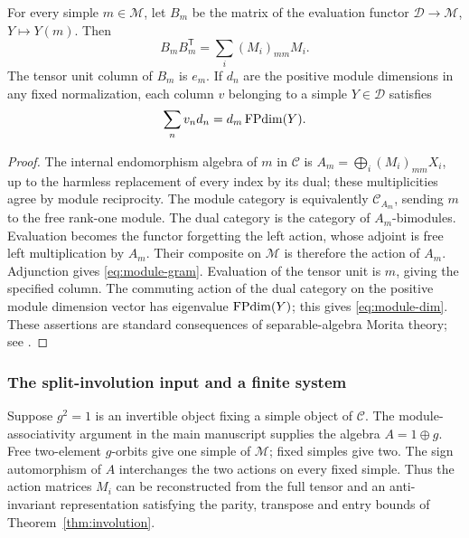\begin{proposition}\label{prop:dual-module-gram}
For every simple $m\in\mathcal M$, let $B_m$ be the matrix of the evaluation
functor $\mathcal D\to\mathcal M$, $Y\mapsto Y(m)$. Then
\begin{equation}\label{eq:module-gram}
 B_mB_m^{\mathsf T}=\sum_i(M_i)_{mm}M_i.
\end{equation}
The tensor unit column of $B_m$ is $e_m$. If $d_n$ are the positive module
dimensions in any fixed normalization, each column $v$ belonging to a
simple $Y\in\mathcal D$ satisfies
\begin{equation}\label{eq:module-dim}
 \sum_n v_nd_n=d_m\operatorname{FPdim}(Y).
\end{equation}
\end{proposition}
\begin{proof}
The internal endomorphism algebra of $m$ in $\mathcal C$ is
$A_m=\bigoplus_i(M_i)_{mm}X_i$, up to the harmless replacement of every
index by its dual; these multiplicities agree by module reciprocity.
The module category is equivalently $\mathcal C_{A_m}$, sending $m$ to
the free rank-one module. The dual category is the category of
$A_m$-bimodules. Evaluation becomes the functor forgetting the left action,
whose adjoint is free left multiplication by $A_m$. Their composite on
$\mathcal M$ is therefore the action of $A_m$. Adjunction gives
\eqref{eq:module-gram}. Evaluation of the tensor unit is $m$, giving the
specified column. The commuting action of the dual category on the
positive module dimension vector has eigenvalue $\operatorname{FPdim}(Y)$; this gives
\eqref{eq:module-dim}. These assertions are standard consequences of
separable-algebra Morita theory; see \cite[Chapter~7]{EGNO}.
\end{proof}

\subsubsection{The split-involution input and a finite system}
Suppose $g^2=1$ is an invertible object fixing a simple object of
$\mathcal C$. The module-associativity argument in the main manuscript
supplies the algebra $A=1\oplus g$. Free two-element $g$-orbits give one
simple of $\mathcal M$; fixed simples give two. The sign automorphism of
$A$ interchanges the two actions on every fixed simple. Thus the action
matrices $M_i$ can be reconstructed from the full tensor and an
anti-invariant representation satisfying the parity, transpose and entry
bounds of Theorem~\ref{thm:involution}.

